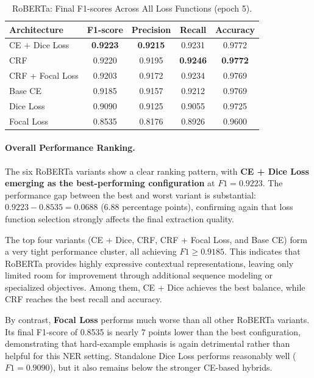 \begin{table}[htbp]
\centering
\caption{RoBERTa: Final F1-scores Across All Loss Functions (epoch 5).}
\begin{tabular}{lcccc}
\hline
\textbf{Architecture} & \textbf{F1-score} & \textbf{Precision} & \textbf{Recall} & \textbf{Accuracy} \\
\hline
CE + Dice Loss & \textbf{0.9223} & \textbf{0.9215} & 0.9231 & 0.9772 \\
CRF & 0.9220 & 0.9195 & \textbf{0.9246} & \textbf{0.9772} \\
CRF + Focal Loss & 0.9203 & 0.9172 & 0.9234 & 0.9769 \\
Base CE & 0.9185 & 0.9157 & 0.9212 & 0.9769 \\
Dice Loss & 0.9090 & 0.9125 & 0.9055 & 0.9725 \\
Focal Loss & 0.8535 & 0.8176 & 0.8926 & 0.9600 \\
\hline
\end{tabular}
\label{tab:roberta_summary}
\end{table}

\paragraph{Overall Performance Ranking.}
The six RoBERTa variants show a clear ranking pattern, with \textbf{CE + Dice Loss emerging as the best-performing configuration} at $F1 = 0.9223$.
The performance gap between the best and worst variant is substantial: $0.9223 - 0.8535 = 0.0688$ (6.88 percentage points), confirming again that loss function selection strongly affects the final extraction quality.

The top four variants (CE + Dice, CRF, CRF + Focal Loss, and Base CE) form a very tight performance cluster, all achieving $F1 \geq 0.9185$.
This indicates that RoBERTa provides highly expressive contextual representations, leaving only limited room for improvement through additional sequence modeling or specialized objectives.
Among them, CE + Dice achieves the best balance, while CRF reaches the best recall and accuracy.

By contrast, \textbf{Focal Loss} performs much worse than all other RoBERTa variants.
Its final F1-score of 0.8535 is nearly 7 points lower than the best configuration, demonstrating that hard-example emphasis is again detrimental rather than helpful for this NER setting.
Standalone Dice Loss performs reasonably well ($F1 = 0.9090$), but it also remains below the stronger CE-based hybrids.

